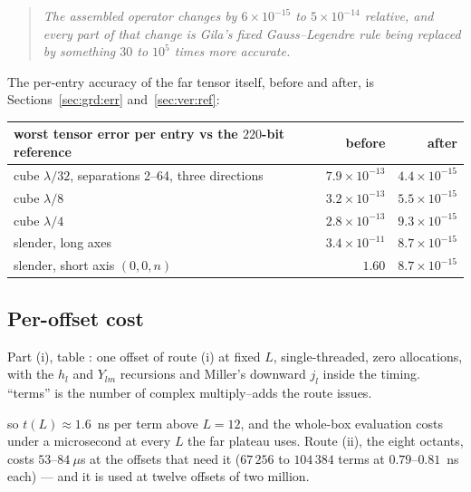 \begin{quote}
\emph{The assembled operator changes by $6\times10^{-15}$ to $5\times10^{-14}$ relative,
and every part of that change is Gila's fixed Gauss--Legendre rule being replaced by
something $30$ to $10^{5}$ times more accurate.}
\end{quote}

The per-entry accuracy of the far tensor itself, before and after, is
Sections~\ref{sec:grd:err} and~\ref{sec:ver:ref}:

\begin{center}\small
\begin{tabular}{@{}lrr@{}}
\toprule
worst tensor error per entry vs the $220$-bit reference & before & after\\
\midrule
cube $\lambda/32$, separations 2--64, three directions & $7.9\times10^{-13}$ &
$4.4\times10^{-15}$\\
cube $\lambda/8$ & $3.2\times10^{-13}$ & $5.5\times10^{-15}$\\
cube $\lambda/4$ & $2.8\times10^{-13}$ & $9.3\times10^{-15}$\\
slender, long axes & $3.4\times10^{-11}$ & $8.7\times10^{-15}$\\
slender, short axis $(0,0,n)$ & $1.60$ & $8.7\times10^{-15}$\\
\bottomrule
\end{tabular}
\end{center}

\subsection{Per-offset cost}
\label{sec:bch:offset}

Part (i), table : one offset of route (i) at fixed $L$, single-threaded,
zero allocations, with the $h_l$ and $Y_{lm}$ recursions and Miller's downward $j_l$ inside
the timing. ``terms'' is the number of complex multiply--adds the route issues.

\begin{center}\small

\end{center}

\noindent
so $t(L) \approx 1.6$~ns per term above $L = 12$, and the whole-box evaluation costs under
a microsecond at every $L$ the far plateau uses. Route (ii), the eight octants, costs
$53$--$84~\mu$s at the offsets that need it ($67\,256$ to $104\,384$ terms at
$0.79$--$0.81$~ns each) --- and it is used at twelve offsets of two million.

